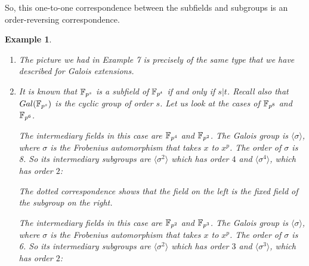 \documentclass[12pt]{article}
\theoremstyle{plain}
\newtheorem{example}{Example}
\theoremstyle{definition}
\theoremstyle{remark}
\begin{document}
\medskip
\noindent
So, this one-to-one correspondence between the subfields and subgroups is an order-reversing correspondence.

\begin{example}
\begin{enumerate}
    \item The picture we had in Example 7 is precisely of the same type that we have described for Galois extensions.
\item It is known that $\mathbb{F}_{p^s}$ is a subfield of $\mathbb{F}_{p^t}$ if and only if $s|t$. Recall also that $Gal(\mathbb{F}_{p^s})$ is the cyclic group of order $s$. Let us look at the cases of $\mathbb{F}_{p^8}$ and $\mathbb{F}_{p^6}$.

\medskip
{} The intermediary fields in this case are $\mathbb{F}_{p^4}$ and $\mathbb{F}_{p^2}$. The Galois group is $\langle\sigma\rangle$, where $\sigma$ is the Frobenius automorphism that takes $x$ to $x^p$. The order of $\sigma$ is 8. So its intermediary subgroups are $\langle \sigma^2\rangle$ which has order $4$ and $\langle \sigma^4\rangle$, which has order $2$:


The dotted correspondence shows that the field on the left is the fixed field of the subgroup on the right.

\medskip
{} The intermediary fields in this case are $\mathbb{F}_{p^2}$ and $\mathbb{F}_{p^3}$. The Galois group is $\langle\sigma\rangle$, where $\sigma$ is the Frobenius automorphism that takes $x$ to $x^p$. The order of $\sigma$ is 6. So its intermediary subgroups are $\langle \sigma^2\rangle$ which has order $3$ and $\langle \sigma^3\rangle$, which has order $2$:


\end{enumerate}
\end{example}
\end{document}

